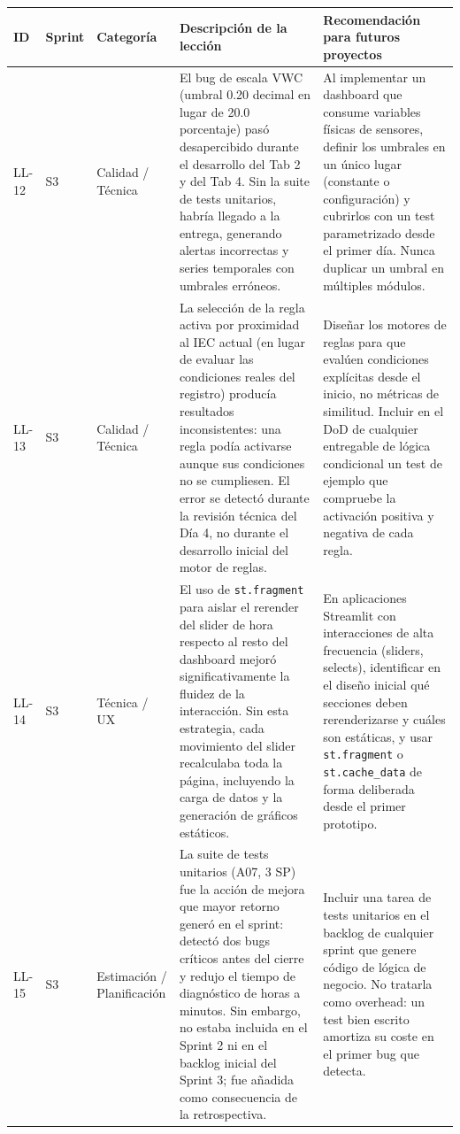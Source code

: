 \documentclass[11pt,a4paper]{article}
\begin{document}
\begin{longtable}{p{} p{} p{} p{} p{}}
\textbf{ID} & \textbf{Sprint} & \textbf{Categoría} & \textbf{Descripción de la lección} & \textbf{Recomendación para futuros proyectos} \\
\hline
LL-12 & S3 & Calidad / Técnica & El bug de escala VWC (umbral 0.20 decimal en lugar de 20.0 porcentaje) pasó desapercibido durante el desarrollo del Tab 2 y del Tab 4. Sin la suite de tests unitarios, habría llegado a la entrega, generando alertas incorrectas y series temporales con umbrales erróneos. & Al implementar un dashboard que consume variables físicas de sensores, definir los umbrales en un único lugar (constante o configuración) y cubrirlos con un test parametrizado desde el primer día. Nunca duplicar un umbral en múltiples módulos. \\
\hline
LL-13 & S3 & Calidad / Técnica & La selección de la regla activa por proximidad al IEC actual (en lugar de evaluar las condiciones reales del registro) producía resultados inconsistentes: una regla podía activarse aunque sus condiciones no se cumpliesen. El error se detectó durante la revisión técnica del Día 4, no durante el desarrollo inicial del motor de reglas. & Diseñar los motores de reglas para que evalúen condiciones explícitas desde el inicio, no métricas de similitud. Incluir en el DoD de cualquier entregable de lógica condicional un test de ejemplo que compruebe la activación positiva y negativa de cada regla. \\
\hline
LL-14 & S3 & Técnica / UX & El uso de \texttt{st.fragment} para aislar el rerender del slider de hora respecto al resto del dashboard mejoró significativamente la fluidez de la interacción. Sin esta estrategia, cada movimiento del slider recalculaba toda la página, incluyendo la carga de datos y la generación de gráficos estáticos. & En aplicaciones Streamlit con interacciones de alta frecuencia (sliders, selects), identificar en el diseño inicial qué secciones deben rerenderizarse y cuáles son estáticas, y usar \texttt{st.fragment} o \texttt{st.cache\_data} de forma deliberada desde el primer prototipo. \\
\hline
LL-15 & S3 & Estimación / Planificación & La suite de tests unitarios (A07, 3 SP) fue la acción de mejora que mayor retorno generó en el sprint: detectó dos bugs críticos antes del cierre y redujo el tiempo de diagnóstico de horas a minutos. Sin embargo, no estaba incluida en el Sprint 2 ni en el backlog inicial del Sprint 3; fue añadida como consecuencia de la retrospectiva. & Incluir una tarea de tests unitarios en el backlog de cualquier sprint que genere código de lógica de negocio. No tratarla como overhead: un test bien escrito amortiza su coste en el primer bug que detecta. \\

\end{longtable}
\end{document}
